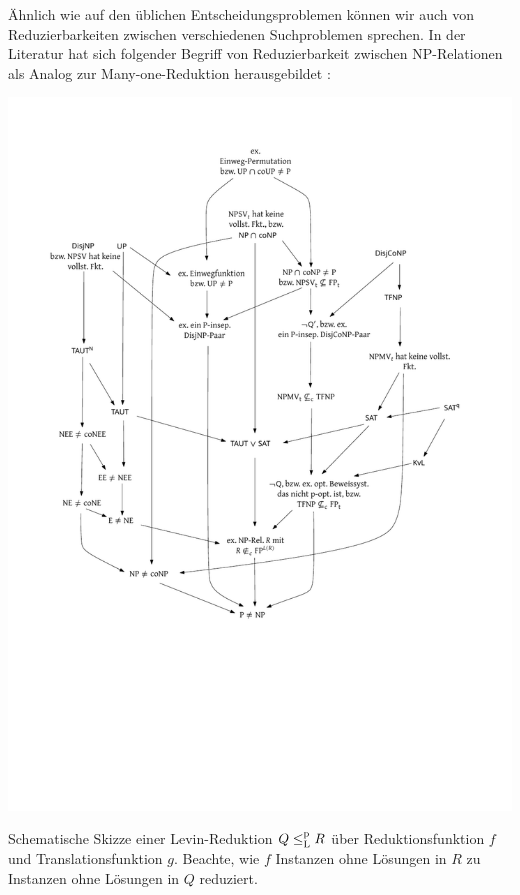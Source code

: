 Ähnlich wie auf den üblichen Entscheidungsproblemen können wir auch von Reduzierbarkeiten zwischen verschiedenen Suchproblemen sprechen. In der Literatur hat sich folgender Begriff von Reduzierbarkeit zwischen NP-Relationen als Analog zur Many-one-Reduktion herausgebildet \parencites(vgl.)()[229]{papadimitriou_computational_1994}[61]{goldreich_computational_2008}[50]{arora_computational_2009}:
\begin{marginfigure}[-10cm]
    \centering\includegraphics[page=11]{figures.pdf}\vspace*{2ex}
    \caption{Schematische Skizze einer Levin-Reduktion $Q\leq_\mathrm{L}^\mathrm{p} R$ über Reduktionsfunktion $f$ und Translationsfunktion $g$. Beachte, wie $f$ Instanzen ohne Lösungen in $R$ zu Instanzen ohne Lösungen in $Q$ reduziert.}
\end{marginfigure}

